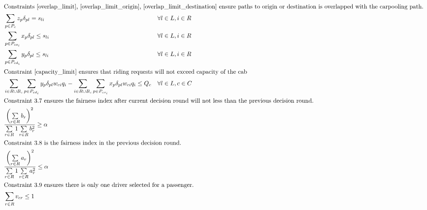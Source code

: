 \begin{align}
  \intertext{Constraints \eqref{overlap_limit}, \eqref{overlap_limit_origin}, \eqref{overlap_limit_destination} ensure paths to origin or destination is overlapped with the carpooling path. }
  & \sum\limits_{p \in P_{c}} z_{p} \delta_{pl} = s_{li} && \forall l \in L, i \in R \label{overlap_limit} \\
  & \sum\limits_{p \in P_{co_i}} x_{p} \delta_{pl} \leq s_{li} && \forall l \in L, i \in R \label{overlap_limit_origin} \\
  & \sum\limits_{p \in P_{cd_i}} y_{p} \delta_{pl} \leq s_{li} && \forall l \in L, i \in R \label{overlap_limit_destination} \\
  \intertext{Constraint \eqref{capacity_limit} ensures that riding requests will not exceed capacity of the cab}
  & \sum\limits_{i \in R \cup B_c} \sum\limits_{p \in P_{cd_i}} y_{p} \delta_{pl} w_{ci} q_i - \sum\limits_{i \in R \cup B_c} \sum\limits_{p \in P_{co_i}} x_{p} \delta_{pl} w_{ci} q_i \leq Q_c && \forall l \in L, c \in C \label{capacity_limit} \\
  \intertext{Constraint 3.7 ensures the fairness index after current decision round will not less than the previous decision round.}
  & \frac{\left(\sum\limits_{r \in R} b_r\right)^2}{\sum\limits_{r \in R} 1 \sum\limits_{r \in R} b_r^2} \geq \alpha \\
  \intertext{Constraint 3.8 is the fairness index in the previous decision round.}
  & \frac{\left(\sum\limits_{r \in R} a_r\right)^2}{\sum\limits_{r \in R} 1 \sum\limits_{r \in R} a_r^2} \leq \alpha \\
  \intertext{Constraint 3.9 ensures there is only one driver selected for a passenger.}
  & \sum\limits_{r \in R} v_{cr} \leq 1
\end{align}

